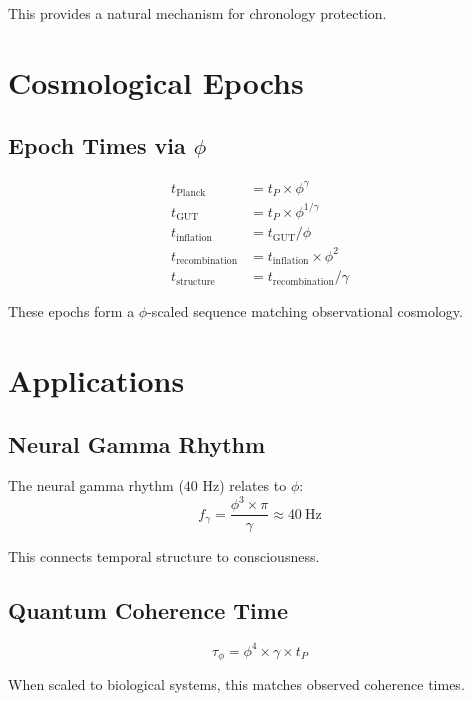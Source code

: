 \documentclass[12pt,a4paper]{article}
\begin{document}
This provides a natural mechanism for chronology protection.

\section{Cosmological Epochs}

\subsection{Epoch Times via $\phi$}

\begin{align}
t_{\text{Planck}} &= t_P \times \phi^\gamma \\
t_{\text{GUT}} &= t_P \times \phi^{1/\gamma} \\
t_{\text{inflation}} &= t_{\text{GUT}} / \phi \\
t_{\text{recombination}} &= t_{\text{inflation}} \times \phi^2 \\
t_{\text{structure}} &= t_{\text{recombination}} / \gamma
\end{align}

These epochs form a $\phi$-scaled sequence matching observational cosmology.

\section{Applications}

\subsection{Neural Gamma Rhythm}

The neural gamma rhythm ($40$ Hz) relates to $\phi$:
\begin{equation}
f_\gamma = \frac{\phi^3 \times \pi}{\gamma} \approx 40~\text{Hz}
\end{equation}

This connects temporal structure to consciousness.

\subsection{Quantum Coherence Time}

\begin{equation}
\tau_\phi = \phi^4 \times \gamma \times t_P
\end{equation}

When scaled to biological systems, this matches observed coherence times.
\end{document}
